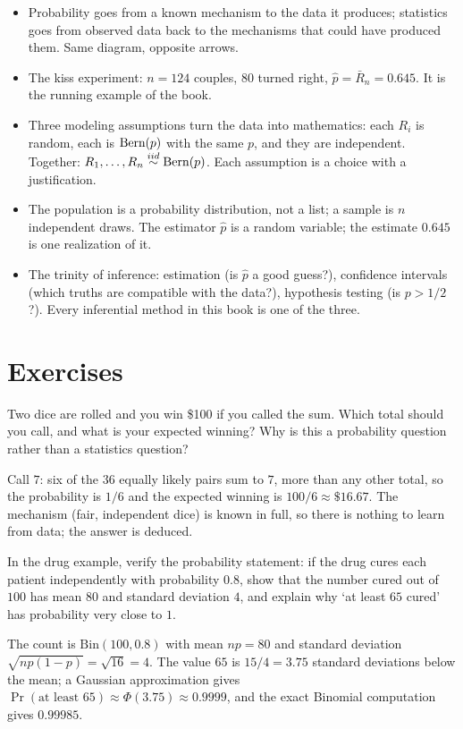 \begin{itemize}[nosep]
\item Probability goes from a known mechanism to the data it produces; statistics goes from observed data back to the mechanisms that could have produced them. Same diagram, opposite arrows.
\item The kiss experiment: $n = 124$ couples, $80$ turned right, $\hat{p} = \bar{R}_n = 0.645$. It is the running example of the book.
\item Three modeling assumptions turn the data into mathematics: each $R_i$ is random, each is $\text{Bern}(p)$ with the same $p$, and they are independent. Together: $R_1, \ldots, R_n \stackrel{iid}{\sim} \text{Bern}(p)$. Each assumption is a choice with a justification.
\item The population is a probability distribution, not a list; a sample is $n$ independent draws. The estimator $\hat{p}$ is a random variable; the estimate $0.645$ is one realization of it.
\item The trinity of inference: estimation (is $\hat{p}$ a good guess?), confidence intervals (which truths are compatible with the data?), hypothesis testing (is $p > 1/2$?). Every inferential method in this book is one of the three.
\end{itemize}

\section{Exercises}
\label{sec:kiss-exercises}

\begin{exercise}
Two dice are rolled and you win \$100 if you called the sum. Which total should you call, and what is your expected winning? Why is this a probability question rather than a statistics question?
\end{exercise}
\begin{solution}
Call $7$: six of the $36$ equally likely pairs sum to $7$, more than any other total, so the probability is $1/6$ and the expected winning is $100/6 \approx \$16.67$. The mechanism (fair, independent dice) is known in full, so there is nothing to learn from data; the answer is deduced.
\end{solution}

\begin{exercise}
In the drug example, verify the probability statement: if the drug cures each patient independently with probability $0.8$, show that the number cured out of $100$ has mean $80$ and standard deviation $4$, and explain why `at least $65$ cured' has probability very close to $1$.
\end{exercise}
\begin{solution}
The count is $\text{Bin}(100, 0.8)$ with mean $np = 80$ and standard deviation $\sqrt{np(1-p)} = \sqrt{16} = 4$. The value $65$ is $15/4 = 3.75$ standard deviations below the mean; a Gaussian approximation gives $\Pr(\text{at least } 65) \approx \Phi(3.75) \approx 0.9999$, and the exact Binomial computation gives $0.99985$.
\end{solution}

